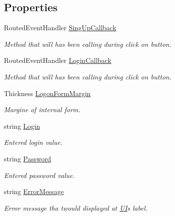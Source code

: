 \subsection*{Properties}
\begin{DoxyCompactItemize}
\item 
Routed\+Event\+Handler \mbox{\hyperlink{class_wpf_handler_1_1_u_i_1_1_controls_1_1_logon_1_1_logon_panel_a0f9d98ee4593b4159b475d04304f9c8c}{Sing\+Up\+Callback}}
\begin{DoxyCompactList}\small\item\em Method that will has been calling during click on button. \end{DoxyCompactList}\item 
Routed\+Event\+Handler \mbox{\hyperlink{class_wpf_handler_1_1_u_i_1_1_controls_1_1_logon_1_1_logon_panel_ad7db982bbf88ecd0a372135e6e3141ff}{Login\+Callback}}
\begin{DoxyCompactList}\small\item\em Method that will has been calling during click on button. \end{DoxyCompactList}\item 
Thickness \mbox{\hyperlink{class_wpf_handler_1_1_u_i_1_1_controls_1_1_logon_1_1_logon_panel_abaaf66c7a6670520ca218fe83f571208}{Logon\+Form\+Margin}}
\begin{DoxyCompactList}\small\item\em Margine of internal form. \end{DoxyCompactList}\item 
string \mbox{\hyperlink{class_wpf_handler_1_1_u_i_1_1_controls_1_1_logon_1_1_logon_panel_abf1db78189d11dc269252a5888f7a613}{Login}}
\begin{DoxyCompactList}\small\item\em Entered login value. \end{DoxyCompactList}\item 
string \mbox{\hyperlink{class_wpf_handler_1_1_u_i_1_1_controls_1_1_logon_1_1_logon_panel_a2b5b8a76a045af6351be2ddaab3ebaf0}{Password}}
\begin{DoxyCompactList}\small\item\em Entered password value. \end{DoxyCompactList}\item 
string \mbox{\hyperlink{class_wpf_handler_1_1_u_i_1_1_controls_1_1_logon_1_1_logon_panel_afa45374205dd8e659e084df9699e49b6}{Error\+Message}}
\begin{DoxyCompactList}\small\item\em Error message tha twould displayed at \mbox{\hyperlink{namespace_wpf_handler_1_1_u_i}{UI}}\textquotesingle{}s label. \end{DoxyCompactList}\end{DoxyCompactItemize}
